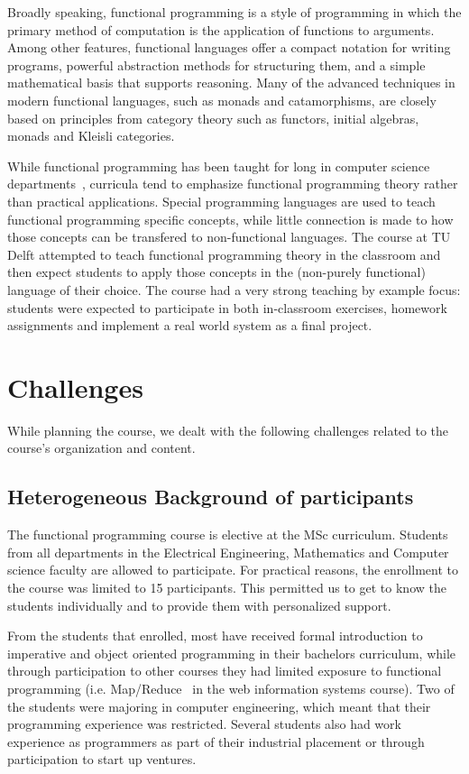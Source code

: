 \documentclass[conference]{IEEEtran}
\begin{document}
Broadly speaking, functional programming is a style of programming in which the
primary method of computation is the application of functions to arguments.
Among other features, functional languages offer a compact notation for writing
programs, powerful abstraction methods for structuring them, and a simple
mathematical basis that supports reasoning. Many of the advanced techniques in
modern functional languages, such as monads and catamorphisms, are closely based
on principles from category theory such as functors, initial algebras, monads
and Kleisli categories.

While functional programming has been taught for long in computer science
departments~\cite{Joost93}, curricula tend to emphasize functional programming
theory rather than practical applications. Special programming languages are
used to teach functional programming specific concepts, while little connection
is made to how those concepts can be transfered to non-functional languages.
The course at TU Delft attempted to teach functional programming theory in the
classroom and then expect students to apply those concepts in the (non-purely
functional) language of their choice. The course had a very strong teaching by
example focus: students were expected to participate in both in-classroom
exercises, homework assignments and implement a real world system as a final
project.

\section{Challenges}

While planning the course, we dealt with the following challenges related
to the course's organization and content.

\subsection{Heterogeneous Background of participants}

The functional programming course is elective at the MSc curriculum. Students
from all departments in the Electrical Engineering, Mathematics and Computer
science faculty are allowed to participate. For practical reasons, the
enrollment to the course was limited to 15 participants. This permitted
us to get to know the students individually and to provide them with
personalized support.

From the students that enrolled, most have received formal introduction to
imperative and object oriented programming in their bachelors curriculum, while
through participation to other courses they had limited exposure to functional
programming (i.e. Map/Reduce~\cite{Dean04} in the web information systems
course). Two of the students were majoring in computer engineering, which meant
that their programming experience was restricted. Several students also had work
experience as programmers as part of their industrial placement or through
participation to start up ventures.
\end{document}
